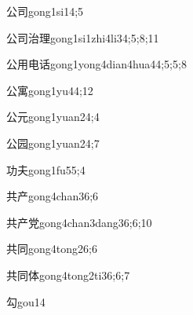 \begin{verbete}{公司}{gong1si1}{4;5}
\end{verbete}

\begin{verbete}{公司治理}{gong1si1zhi4li3}{4;5;8;11}
\end{verbete}

\begin{verbete}{公用电话}{gong1yong4dian4hua4}{4;5;5;8}
\end{verbete}

\begin{verbete}{公寓}{gong1yu4}{4;12}
\end{verbete}

\begin{verbete}{公元}{gong1yuan2}{4;4}
\end{verbete}

\begin{verbete}{公园}{gong1yuan2}{4;7}
\end{verbete}

\begin{verbete}{功夫}{gong1fu5}{5;4}
\end{verbete}

\begin{verbete}{共产}{gong4chan3}{6;6}
\end{verbete}

\begin{verbete}{共产党}{gong4chan3dang3}{6;6;10}
\end{verbete}

\begin{verbete}{共同}{gong4tong2}{6;6}
\end{verbete}

\begin{verbete}{共同体}{gong4tong2ti3}{6;6;7}
\end{verbete}

\begin{verbete}{勾}{gou1}{4}
\end{verbete}

